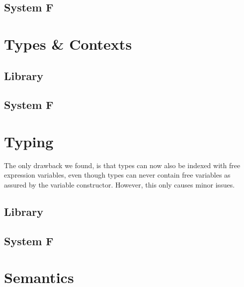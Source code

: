 \documentclass[sigplan,10pt]{acmart}
\newenvironment{LibCode*}{%
  \begin{tcolorbox}[%
    colframe=white,%
    boxrule=0.0pt,%
    top=2.5pt,%
    left=2.5pt,%
    bottom=2.5pt,%
    right=2.5pt,%
    boxsep=0pt%
  ]\vspace{-0.2\baselineskip}%
}{%
  \vspace{-1\baselineskip}%
  \end{tcolorbox}%
}
\newcommand*\LibCode[1]{\begin{LibCode*}{#1}\end{LibCode*}}
\newcommand*\AppCode[1]{{#1}}
\begin{document}
  \subsection{System F}
  \AppCode\FAssoc
  \AppCode\FAssocProofInteresting
  \AppCode\FComposeTraversal

  \section{Types \& Contexts}
  \subsection{Library}
  \LibCode\KTypeSorts
  \LibCode\KTypes
  \LibCode\KContextHelper
  \LibCode\KContexts
  \LibCode\KContextLookup
  \subsection{System F}
  \AppCode\FTypes

  \section{Typing}
  The only drawback we found, is that types can now also be indexed
  with free expression variables, even though types can never contain
  free variables as assured by the variable constructor. However, this
  only causes minor issues.

  \subsection{Library}
  \LibCode\KVariableTyping
  \LibCode\KTyping
  \LibCode\KTypingKit
  \LibCode\KMapTyping
  \LibCode\KLiftTyping
  \LibCode\KSingleTyping
  \LibCode\KTypingNotation
  \LibCode\KTypingTraversal
  \LibCode\KTypingInstances
  \subsection{System F}
  \AppCode\FTyping
  \AppCode\FTypingInst
  \AppCode\FPreserve
  \AppCode\FTypingTraversal

  \section{Semantics}
  \AppCode\FReduction
\end{document}
